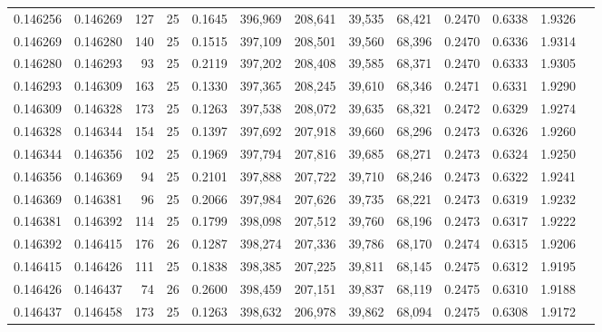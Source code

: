 \begin{tabular}{rrrrrrrrrrrrr}
0.146256 & 0.146269 &   127 &  25 &                                     0.1645 & 396,969 & 208,641 &  39,535 &  68,421 & 0.2470 & 0.6338 & 1.9326 \\
0.146269 & 0.146280 &   140 &  25 &                                     0.1515 & 397,109 & 208,501 &  39,560 &  68,396 & 0.2470 & 0.6336 & 1.9314 \\
0.146280 & 0.146293 &    93 &  25 &                                     0.2119 & 397,202 & 208,408 &  39,585 &  68,371 & 0.2470 & 0.6333 & 1.9305 \\
0.146293 & 0.146309 &   163 &  25 &                                     0.1330 & 397,365 & 208,245 &  39,610 &  68,346 & 0.2471 & 0.6331 & 1.9290 \\
0.146309 & 0.146328 &   173 &  25 &                                     0.1263 & 397,538 & 208,072 &  39,635 &  68,321 & 0.2472 & 0.6329 & 1.9274 \\
0.146328 & 0.146344 &   154 &  25 &                                     0.1397 & 397,692 & 207,918 &  39,660 &  68,296 & 0.2473 & 0.6326 & 1.9260 \\
0.146344 & 0.146356 &   102 &  25 &                                     0.1969 & 397,794 & 207,816 &  39,685 &  68,271 & 0.2473 & 0.6324 & 1.9250 \\
0.146356 & 0.146369 &    94 &  25 &                                     0.2101 & 397,888 & 207,722 &  39,710 &  68,246 & 0.2473 & 0.6322 & 1.9241 \\
0.146369 & 0.146381 &    96 &  25 &                                     0.2066 & 397,984 & 207,626 &  39,735 &  68,221 & 0.2473 & 0.6319 & 1.9232 \\
0.146381 & 0.146392 &   114 &  25 &                                     0.1799 & 398,098 & 207,512 &  39,760 &  68,196 & 0.2473 & 0.6317 & 1.9222 \\
0.146392 & 0.146415 &   176 &  26 &                                     0.1287 & 398,274 & 207,336 &  39,786 &  68,170 & 0.2474 & 0.6315 & 1.9206 \\
0.146415 & 0.146426 &   111 &  25 &                                     0.1838 & 398,385 & 207,225 &  39,811 &  68,145 & 0.2475 & 0.6312 & 1.9195 \\
0.146426 & 0.146437 &    74 &  26 &                                     0.2600 & 398,459 & 207,151 &  39,837 &  68,119 & 0.2475 & 0.6310 & 1.9188 \\
0.146437 & 0.146458 &   173 &  25 &                                     0.1263 & 398,632 & 206,978 &  39,862 &  68,094 & 0.2475 & 0.6308 & 1.9172 \\

\end{tabular}

